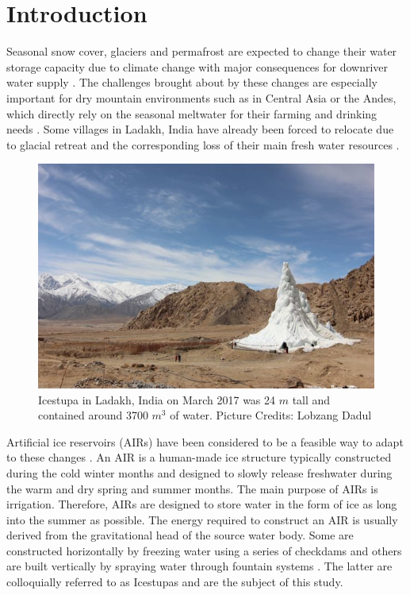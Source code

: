 \documentclass[utf8]{frontiersSCNS} %
\begin{document}
\section{Introduction}

Seasonal snow cover, glaciers and permafrost are expected to change their water storage capacity due to climate change
with major consequences for downriver water supply \citep{Immerzeel_2020}. The challenges brought about by these
changes are especially important for dry mountain environments such as in Central Asia or the Andes, which directly
rely on the seasonal meltwater for their farming and drinking needs \citep{HoelzleBarandun_2019, Apel_2018,
Buytaert_2017, Chen_2016, UNGERSHAYESTEH_2013}. Some villages in Ladakh, India have already been forced to relocate
due to glacial retreat and the corresponding loss of their main fresh water resources \citep{zanskar}. 

\begin{figure} \begin{center} \includegraphics[width=10 cm]{Figures/Figure_1.jpg}
\end{center} \caption{Icestupa in Ladakh, India on March 2017 was 24 $m$ tall and contained around 3700 $m^3$ 
of water. Picture Credits: Lobzang Dadul} \label{fig:cone} \end{figure}

Artificial ice reservoirs (AIRs) have been considered to be a feasible way to adapt to these changes \citep{IPCC_2019,
10.1659/MRD-JOURNAL-D-18-00072.1}. An AIR is a human-made ice structure typically constructed during the cold winter
months and designed to slowly release freshwater during the warm and dry spring and summer months. The main purpose of
AIRs is irrigation. Therefore, AIRs are designed to store water in the form of ice as long into the summer as possible.
The energy required to construct an AIR is usually derived from the gravitational head of the source water body. Some
are constructed horizontally by freezing water using a series of checkdams and others are built vertically by spraying
water through fountain systems \citep{Nusser_2018}. The latter are colloquially referred to as Icestupas and are the
subject of this study.
\end{document}
